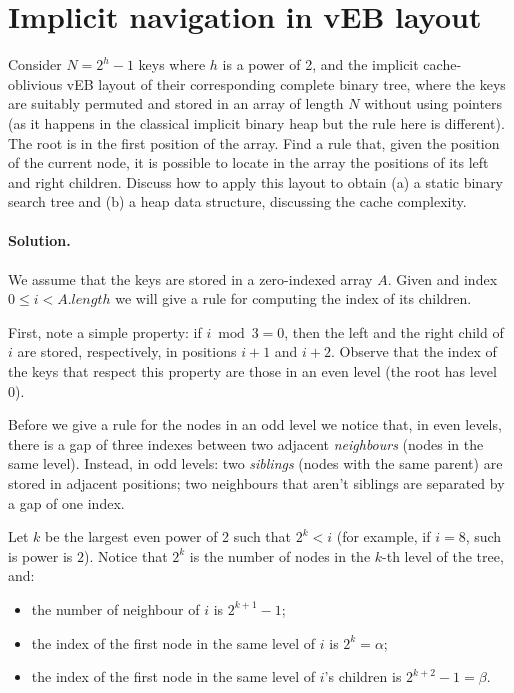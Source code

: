 \section{Implicit navigation in vEB layout}
Consider $N = 2^h - 1$ keys where $h$ is a power of 2, and the implicit cache-oblivious vEB layout of their corresponding complete binary tree, where the keys are suitably permuted and stored in an array of length $N$ without using pointers (as it happens in the classical implicit binary heap but the rule here is different). The root is in the first position of the array. Find a rule that, given the position of the current node, it is possible to locate in the array the positions of its left and right children. Discuss how to apply this layout to obtain (a) a static binary search tree and (b) a heap data structure, discussing the cache complexity.

\vspace{0.5cm}
\paragraph{Solution.} We assume that the keys are stored in a zero-indexed array $A$. Given and index $0 \leq i < A.length$ we will give a rule for computing the index of its children.

\begin{center}
\end{center}

First, note a simple property: if $i \bmod 3 = 0$, then the left and the right child of $i$ are stored, respectively, in positions $i+1$ and $i+2$. Observe that the index of the keys that respect this property are those in an even level (the root has level 0).

Before we give a rule for the nodes in an odd level we notice that, in even levels, there is a gap of three indexes between two adjacent \emph{neighbours} (nodes in the same level). Instead, in odd levels: two \emph{siblings} (nodes with the same parent) are stored in adjacent positions; two neighbours that aren't siblings are separated by a gap of one index.

Let $k$ be the largest even power of 2 such that $2^k<i$ (for example, if $i=8$, such is power is $2$). Notice that $2^k$ is the number of nodes in the $k$-th level of the tree, and:
\begin{itemize}
  \item the number of neighbour of $i$ is $2^{k+1}-1$;
  \item the index of the first node in the same level of $i$ is $2^k=\alpha$; 
 \item the index of the first node in the same level of $i$'s children is $2^{k+2}-1=\beta$.
\end{itemize}

